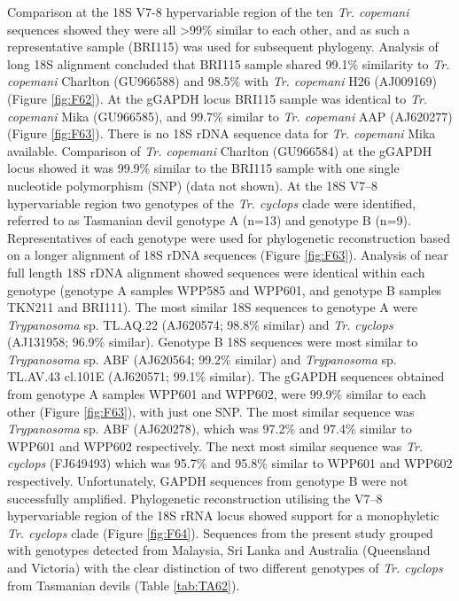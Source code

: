 \documentclass[a4paper, nobind]{templates/ociamthesis}
\begin{document}
Comparison at the 18S V7-8 hypervariable region of the ten \emph{Tr. copemani} sequences showed they were all \textgreater99\% similar to each other, and as such a representative sample (BRI115) was used for subsequent phylogeny.
Analysis of long 18S alignment concluded that BRI115 sample shared 99.1\% similarity to \emph{Tr. copemani} Charlton (GU966588) and 98.5\% with \emph{Tr. copemani} H26 (AJ009169) (Figure \ref{fig:F62}).
At the gGAPDH locus BRI115 sample was identical to \emph{Tr. copemani} Mika (GU966585), and 99.7\% similar to \emph{Tr. copemani} AAP (AJ620277) (Figure \ref{fig:F63}).
There is no 18S rDNA sequence data for \emph{Tr. copemani} Mika available.
Comparison of \emph{Tr. copemani} Charlton (GU966584) at the gGAPDH locus showed it was 99.9\% similar to the BRI115 sample with one single nucleotide polymorphism (SNP) (data not shown).
At the 18S V7--8 hypervariable region two genotypes of the \emph{Tr. cyclops} clade were identified, referred to as Tasmanian devil genotype A (n=13) and genotype B (n=9).
Representatives of each genotype were used for phylogenetic reconstruction based on a longer alignment of 18S rDNA sequences (Figure \ref{fig:F63}).
Analysis of near full length 18S rDNA alignment showed sequences were identical within each genotype (genotype A samples WPP585 and WPP601, and genotype B samples TKN211 and BRI111).
The most similar 18S sequences to genotype A were \emph{Trypanosoma} sp. TL.AQ.22 (AJ620574; 98.8\% similar) and \emph{Tr. cyclops} (AJ131958; 96.9\% similar).
Genotype B 18S sequences were most similar to \emph{Trypanosoma} sp. ABF (AJ620564; 99.2\% similar) and \emph{Trypanosoma} sp. TL.AV.43 cl.101E (AJ620571; 99.1\% similar).
The gGAPDH sequences obtained from genotype A samples WPP601 and WPP602, were 99.9\% similar to each other (Figure \ref{fig:F63}), with just one SNP.
The most similar sequence was \emph{Trypanosoma} sp. ABF (AJ620278), which was 97.2\% and 97.4\% similar to WPP601 and WPP602 respectively.
The next most similar sequence was \emph{Tr. cyclops} (FJ649493) which was 95.7\% and 95.8\% similar to WPP601 and WPP602 respectively.
Unfortunately, GAPDH sequences from genotype B were not successfully amplified.
Phylogenetic reconstruction utilising the V7--8 hypervariable region of the 18S rRNA locus showed support for a monophyletic \emph{Tr. cyclops} clade (Figure \ref{fig:F64}).
Sequences from the present study grouped with genotypes detected from Malaysia, Sri Lanka and Australia (Queensland and Victoria) with the clear distinction of two different genotypes of \emph{Tr. cyclops} from Tasmanian devils (Table \ref{tab:TA62}).
\end{document}
